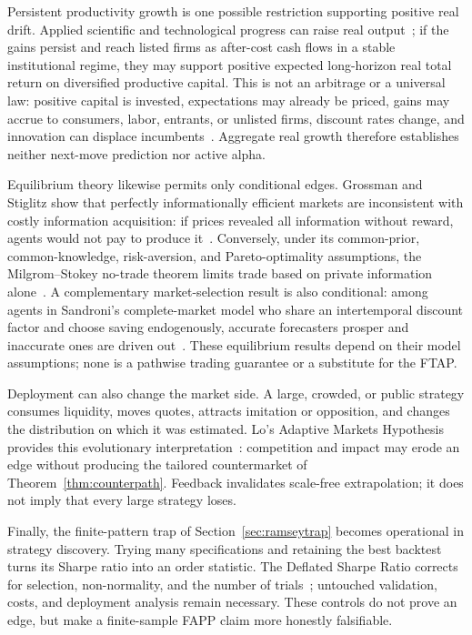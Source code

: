 \documentclass[aps,pra,reprint,superscriptaddress,amsmath,amssymb,floatfix]{revtex4-2}
\theoremstyle{plain}
\theoremstyle{definition}
\theoremstyle{remark}
\begin{document}
Persistent productivity growth is one possible restriction supporting
positive real drift. Applied scientific and technological progress can raise
real output~\cite{Solow1957}; if the gains persist and reach listed firms as
after-cost cash flows in a stable institutional regime, they may support
positive expected long-horizon real total return on diversified productive
capital. This is not an arbitrage or a universal law: positive capital is
invested, expectations may already be priced, gains may accrue to consumers,
labor, entrants, or unlisted firms, discount rates change, and innovation can
displace incumbents~\cite{Schumpeter1942}. Aggregate real growth therefore
establishes neither next-move prediction nor active alpha.

Equilibrium theory likewise permits only conditional edges. Grossman and
Stiglitz show that perfectly informationally efficient markets are inconsistent
with costly information acquisition: if prices revealed all information
without reward, agents would not pay to produce it~\cite{GrossmanStiglitz1980}.
Conversely, under its common-prior, common-knowledge, risk-aversion, and
Pareto-optimality assumptions, the Milgrom--Stokey no-trade theorem limits trade
based on private information alone~\cite{MilgromStokey1982}. A complementary
market-selection result is also conditional: among agents in Sandroni's
complete-market model who share an intertemporal discount factor and choose
saving endogenously, accurate forecasters prosper and inaccurate ones are driven
out~\cite{Sandroni2000}. These equilibrium results depend on their model
assumptions; none is a pathwise trading guarantee or a substitute for the FTAP.

Deployment can also change the market side. A large, crowded, or public
strategy consumes liquidity, moves quotes, attracts imitation or opposition,
and changes the distribution on which it was estimated. Lo's Adaptive Markets
Hypothesis provides this evolutionary interpretation~\cite{Lo2004}: competition
and impact may erode an edge without producing the tailored countermarket of
Theorem~\ref{thm:counterpath}. Feedback invalidates scale-free extrapolation; it
does not imply that every large strategy loses.

Finally, the finite-pattern trap of Section~\ref{sec:ramseytrap} becomes
operational in strategy discovery. Trying many specifications and retaining the
best backtest turns its Sharpe ratio into an order statistic. The Deflated
Sharpe Ratio corrects for selection, non-normality, and the number of
trials~\cite{BaileyLopez2014}; untouched validation, costs, and deployment
analysis remain necessary. These controls do not prove an edge, but make a
finite-sample FAPP claim more honestly falsifiable.
\end{document}
